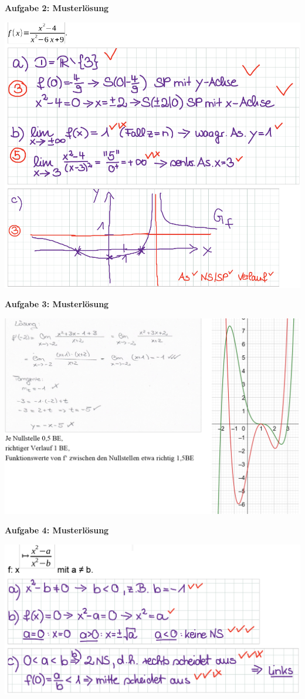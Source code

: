 \documentclass[a4paper,12pt]{article}
\newcommand{\Aufgabe}[1]{
  {
  \vspace*{0.5cm}
  \textsf{\textbf{Aufgabe #1}}
  \vspace*{0.2cm}
  
  }
}
\begin{document}
\Aufgabe{2: Musterlösung}
\includegraphics[width=\linewidth]{Q11_1KlausurJanuar2022_ml2.png}

\newpage
\Aufgabe{3: Musterlösung}
\includegraphics[width=\linewidth]{Q11_1KlausurJanuar2022_ml3a.png}

\Aufgabe{4: Musterlösung}
\includegraphics[width=\linewidth]{Q11_1KlausurJanuar2022_ml4.png}
\end{document}
